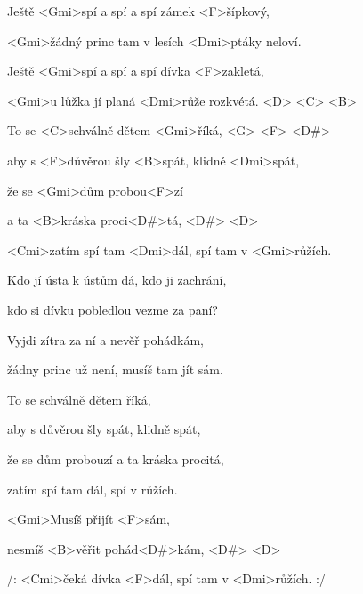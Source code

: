 

\zs
Ještě <Gmi>spí a spí a spí zámek <F>šípkový,

<Gmi>žádný princ tam v lesích <Dmi>ptáky neloví.

Ještě <Gmi>spí a spí a spí dívka <F>zakletá,

<Gmi>u lůžka jí planá <Dmi>růže rozkvétá. <D> <C> <B> 

To se <C>schválně dětem <Gmi>říká, <G> <F> <D#> 

aby s <F>důvěrou šly <B>spát, klidně <Dmi>spát,

že se <Gmi>dům probou<F>zí

a ta <B>kráska proci<D#>tá, <D#> <D> 

<Cmi>zatím spí tam <Dmi>dál, spí tam v <Gmi>růžích.
\ks

\zs
Kdo jí ústa k ústům dá, kdo ji zachrání,

kdo si dívku pobledlou vezme za paní?

Vyjdi zítra za ní a nevěř pohádkám,

žádny princ už není, musíš tam jít sám.

To se schválně dětem říká,

aby s důvěrou šly spát, klidně spát,

že se dům probouzí a ta kráska procitá,

zatím spí tam dál, spí v růžích.
\ks

\zs
<Gmi>Musíš přijít <F>sám,

nesmíš <B>věřit pohád<D#>kám, <D#> <D> 

/: <Cmi>čeká dívka <F>dál, spí tam v <Dmi>růžích. :/
\ks

\kp






















